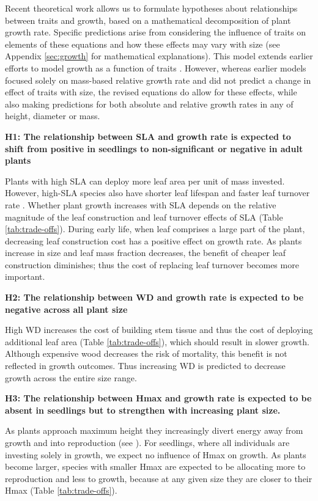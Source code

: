 \documentclass[a4paper,11pt]{article}
\begin{document}
Recent theoretical work \citep{Falster:2011ii} allows us to formulate hypotheses about relationships between traits and growth, based on a mathematical decomposition of plant growth rate. Specific predictions arise from considering the influence of traits on elements of these equations and how these effects may vary with size (see Appendix \ref{sec:growth} for mathematical explanations). This model extends earlier efforts to model growth as a function of traits \citep{Lambers:1992bj,cornelissen_seedling_1996,Wright:2000kw,Enquist:2007ek}. However, whereas earlier models focused solely on mass-based relative growth rate and did not predict a change in effect of traits with size, the revised equations do allow for these effects, while also making predictions for both absolute and relative growth rates in any of height, diameter or mass.

\textbf{H1: The relationship between SLA and growth rate is expected to shift from positive in seedlings to non-significant or negative in adult plants}

Plants with high SLA can deploy more leaf area per unit of mass invested. However, high-SLA species also have shorter leaf lifespan and faster leaf turnover rate \citep{Wright:2004jb}. Whether plant growth increases with SLA depends on the relative magnitude of the leaf construction and leaf turnover effects of SLA (Table \ref{tab:trade-offs}). During early life, when leaf comprises a large part of the plant, decreasing leaf construction cost has a positive effect on growth rate. As plants increase in size and leaf mass fraction decreases, the benefit of cheaper leaf construction diminishes; thus the cost of replacing leaf turnover becomes more important.

\textbf{H2: The relationship between WD and growth rate is expected to be negative across all plant size}

High WD increases the cost of building stem tissue and thus the cost of deploying additional leaf area (Table \ref{tab:trade-offs}), which should result in slower growth. Although expensive wood decreases the risk of mortality, this benefit is not reflected in growth outcomes. Thus increasing WD is predicted to decrease growth across the entire size range.

\textbf{H3: The relationship between Hmax and growth rate is expected to be absent in seedlings but to strengthen with increasing plant size.}

As plants approach maximum height they increasingly divert energy away from growth and into reproduction (see \citealt{Thomas:1996do,Thomas-2011, Wenk:2014jz}). For seedlings, where all individuals are investing solely in growth, we expect no influence of Hmax on growth. As plants become larger, species with smaller Hmax are expected to be allocating more to reproduction and less to growth, because at any given size they are closer to their Hmax (Table \ref{tab:trade-offs}).
\end{document}
